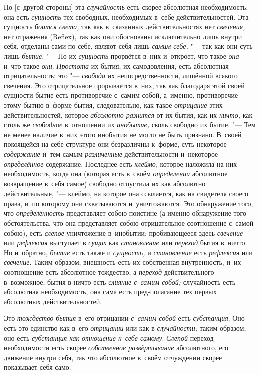 Но [с~другой стороны] эта {\em случайность} есть скорее
абсолютная необходимость; она есть {\em сущность} тех
свободных, необходимых в~себе действительностей. Эта сущность
{\em боится света,} так как в~сказанных
действительностях нет {\em свечения,} нет отражения
(Reflex), так как они обоснованы исключительно лишь внутри себя, отделаны
сами по себе, являют себя лишь {\em самим себе,} "--- так
как они суть лишь {\em бытие}. "--- Но их
{\em сущность} прорвётся в~них и~откроет, что такое
{\em она} и~что такое {\em они}.
{\em Простота} их бытия, их самодовления, есть
абсолютная отрицательность; это "--- {\em свобода} их
непосредственности, лишённой всякого свечения. Это отрицательное
прорывается в~них, так как благодаря этой своей сущности бытие есть
противоречие с~самим собой, а~именно, противоречие этому бытию в~форме
бытия, следовательно, как такое {\em отрицание} этих
действительностей, которое {\em абсолютно разнится} от
их бытия, как их {\em ничто,} как столь же
{\em свободное} в~отношении их
{\em инобытие,} сколь свободно их бытие. "--- Тем не менее
наличие в~них этого инобытия не могло не быть признано. В~своей покоящейся
на себе структуре они безразличны к~форме, суть некоторое
{\em содержание} и~тем самым
{\em различенные} действительности и~некоторое
{\em определённое} содержание. Последнее есть
{\em клеймо,} которое наложила на них необходимость,
когда она (которая есть в~своём {\em определении}
абсолютное возвращение в~себя самое) свободно отпустила их как абсолютно
действительные, "--- клеймо, на которое она ссылается, как на свидетеля своего
права, и~по которому они схватываются и~уничтожаются. Это обнаружение того,
что {\em определённость} представляет собою поистине (а
именно обнаружение того обстоятельства, что она представляет собою
отрицательное соотношение с~самой собою), есть
{\em слепое} уничтожение в~инобытии; пробивающееся
здесь {\em свечение} или {\em рефлексия} выступает в
{\em сущих} как {\em становление}
или {\em переход} бытия в~ничто. Но и~обратно, {\em бытие} есть также и
{\em сущность,} и {\em становление} есть {\em рефлексия} или
{\em свечение}. Таким образом, внешность есть их
собственная внутренность, и~их соотношение есть абсолютное тождество, а
{\em переход} действительного в~возможное, бытия в
ничто есть {\em слияние с~самим собой;} случайность
есть абсолютная необходимость, она сама есть пред-полагание тех первых
абсолютных действительностей.

Это {\em тождество бытия} в~его отрицании {\em с~самим собой} есть
{\em субстанция}. Оно есть это единство как в~его {\em отрицании} или
как в {\em случайности;} таким образом, оно есть {\em субстанция как
отношение к~себе самому}. {\em Слепой} переход необходимости есть скорее
{\em собственное развёртывание} абсолютного, его движение внутри себя,
так что абсолютное в~своём отчуждении скорее показывает себя само.
